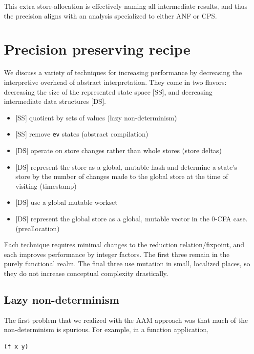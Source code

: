 \documentclass[preprint,onecolumn,9pt]{sigplanconf} %
\begin{document}
This extra store-allocation is effectively naming all intermediate
results, and thus the precision aligns with an analysis specialized to
either ANF or CPS.


\section{Precision preserving recipe}
\label{sec:opt}

We discuss a variety of techniques for increasing performance by
decreasing the interpretive overhead of abstract interpretation. They
come in two flavors: decreasing the size of the represented state
space [SS], and decreasing intermediate data structures [DS].

\begin{itemize}
 \item{[SS] quotient by sets of values (lazy non-determinism)}
 \item{[SS] remove {\tt ev} states (abstract compilation)}
 \item{[DS] operate on store changes rather than whole stores (store deltas)}
 \item{[DS] represent the store as a global, mutable hash and
   determine a state's store by the number of changes made to the
   global store at the time of visiting (timestamp)}
 \item{[DS] use a global mutable workset}
 \item{[DS] represent the global store as a global, mutable vector in
   the 0-CFA case. (preallocation)}
\end{itemize}
Each technique requires minimal changes to the reduction
relation/fixpoint, and each improves performance by integer
factors. The first three remain in the purely functional realm. The
final three use mutation in small, localized places, so they do not
increase conceptual complexity drastically.

\subsection{Lazy non-determinism}

The first problem that we realized with the AAM approach was that much
of the non-determinism is spurious. For example, in a function
application,
\begin{center}{\tt (f x y)}\end{center}
\end{document}
